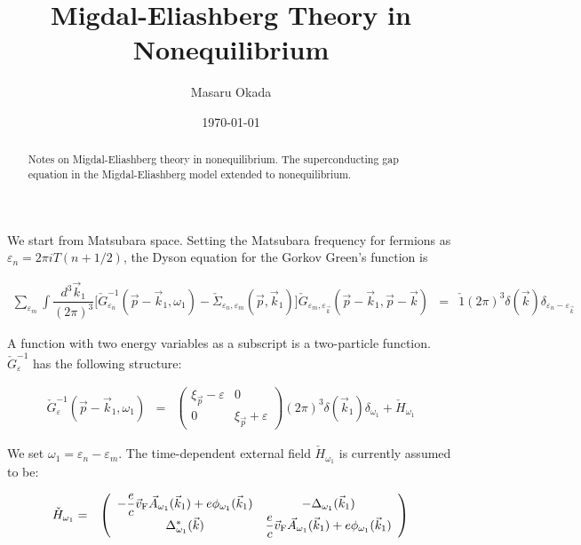 \documentclass[uplatex,a4j,12pt,dvipdfmx]{jsarticle}
\title{Migdal-Eliashberg Theory in Nonequilibrium}
\author{Masaru Okada}
\date{\today}
\begin{document}
\maketitle

\begin{abstract}
	Notes on Migdal-Eliashberg theory in nonequilibrium.
	The superconducting gap equation in the Migdal-Eliashberg model extended to nonequilibrium.
\end{abstract}

We start from Matsubara space.
Setting the Matsubara frequency for fermions as $\varepsilon_{n} = 2 \pi i T (n + 1/2)$, the Dyson equation for the Gorkov Green's function is

\begin{eqnarray}
	\sum_{\varepsilon_{m}}
	\int \dfrac{ d^{3} \vec{k}_{1} }{ (2 \pi)^{3} }
	\Big[ \check{G}^{-1}_{\varepsilon_{n}} (\vec{p} - \vec{k}_{1} , \omega_{1} ) - \check{\mathit{\Sigma}}_{\varepsilon_{n},\varepsilon_{m}}(\vec{p},\vec{k}_{1}) \Big]
	\check{G}_{\varepsilon_{m},\varepsilon_{\vec{k}}} ( \vec{p} - \vec{k}_{1} , \vec{p} - \vec{k} )
	&=&
	\check{1} (2 \pi)^{3} \delta(\vec{k}) \delta_{\varepsilon_{n} - \varepsilon_{\vec{k}}}
	\label{eqn:dysonone}
\end{eqnarray}

A function with two energy variables as a subscript is a two-particle function.
$\check{G}^{-1}_{\varepsilon}$ has the following structure:

\begin{eqnarray}
	\check{G}^{-1}_{\varepsilon}(\vec{p}-\vec{k}_{1},\omega_{1})
	&=&
	\left(
	\begin{array}{cc}
		\xi_{\vec{p}} - \varepsilon & 0
		\\
		0                           & \xi_{\vec{p}} + \varepsilon
	\end{array}
	\right)
	(2 \pi)^{3}
	\delta(\vec{k}_{1})
	\delta_{\omega_{1}}
	+
	\check{H}_{\omega_{1}}
\end{eqnarray}

We set $\omega_{1} = \varepsilon_{n} - \varepsilon_{m}$.
The time-dependent external field $\check{H}_{\omega_{1}}$ is currently assumed to be:

\begin{eqnarray}
	\check{H}_{\omega_{1}}
	&=&
	\left(
	\begin{array}{cc}
			- \dfrac{e}{c} \vec{v}_{\rm F} \vec{A}_{\omega_{1}} (\vec{k}_{1}) + e \phi_{\omega_{1}}(\vec{k}_{1}) & - \Delta_{\omega_{1}} (\vec{k}_{1})
			\\
			\Delta^{*}_{\omega_{1}} (\vec{k})                                                                    & \dfrac{e}{c} \vec{v}_{\rm F} \vec{A}_{\omega_{1}} (\vec{k}_{1}) + e \phi_{\omega_{1}} (\vec{k}_{1})
		\end{array}
	\right)
\end{eqnarray}
\end{document}
